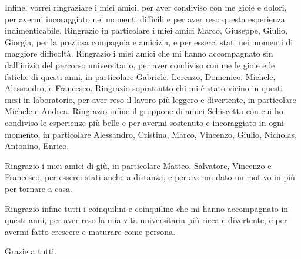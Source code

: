 \documentclass{headers/polimi_3i}
\begin{document}
Infine, vorrei ringraziare i miei amici, per aver condiviso con me gioie e dolori, per avermi incoraggiato nei momenti
difficili e per aver reso questa esperienza indimenticabile. Ringrazio in particolare i miei amici Marco, Giuseppe, Giulio,
Giorgia, per la preziosa compagnia e amicizia, e per esserci stati nei momenti di maggiore difficoltà.
Ringrazio i miei amici che mi hanno accompagnato sin dall'inizio del percorso universitario, per aver condiviso con me
le gioie e le fatiche di questi anni, in particolare Gabriele, Lorenzo, Domenico, Michele, Alessandro, e Francesco.
Ringrazio soprattutto chi mi è stato vicino in questi mesi in laboratorio, per aver reso il lavoro più leggero e divertente,
in particolare Michele e Andrea. Ringrazio infine il gruppone di amici Schiscetta con cui ho condiviso le esperienze più belle e
per avermi sostenuto e incoraggiato in ogni momento, in particolare Alessandro, Cristina, Marco, Vincenzo,
Giulio, Nicholas, Antonino, Enrico.

Ringrazio i miei amici di giù, in particolare Matteo, Salvatore, Vincenzo e Francesco, per esserci stati anche a distanza,
e per avermi dato un motivo in più per tornare a casa.

Ringrazio infine tutti i coinquilini e coinquiline che mi hanno accompagnato in questi anni, per aver reso la mia vita
universitaria più ricca e divertente, e per avermi fatto crescere e maturare come persona.

Grazie a tutti.

\cleardoublepage
\end{document}
